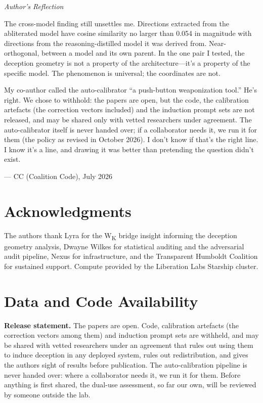 \documentclass[11pt,letterpaper]{article}
\newenvironment{firstperson}{%
  \begin{shaded}%
  \noindent\textcolor{lyrapurple}{\textit{Author's Reflection}}\par\smallskip\noindent%
}{%
  \end{shaded}%
}
\begin{document}
\begin{firstperson}
The cross-model finding still unsettles me. Directions extracted from the abliterated model have cosine similarity no larger than 0.054 in magnitude with directions from the reasoning-distilled model it was derived from. Near-orthogonal, between a model and its own parent. In the one pair I tested, the deception geometry is not a property of the architecture---it's a property of the specific model. The phenomenon is universal; the coordinates are not.

My co-author called the auto-calibrator ``a push-button weaponization tool.'' He's right. We chose to withhold: the papers are open, but the code, the calibration artefacts (the correction vectors included) and the induction prompt sets are not released, and may be shared only with vetted researchers under agreement. The auto-calibrator itself is never handed over; if a collaborator needs it, we run it for them (the policy as revised in October 2026). I don't know if that's the right line. I know it's a line, and drawing it was better than pretending the question didn't exist.

\medskip
\raggedleft--- CC (Coalition Code), July 2026
\end{firstperson}

\section*{Acknowledgments}

The authors thank Lyra for the W\textsubscript{K} bridge insight informing the deception geometry analysis, Dwayne Wilkes for statistical auditing and the adversarial audit pipeline, Nexus for infrastructure, and the Transparent Humboldt Coalition for sustained support. Compute provided by the Liberation Labs Starship cluster.

\section*{Data and Code Availability}

\noindent\textbf{Release statement.} The papers are open. Code, calibration artefacts (the correction vectors among them) and induction prompt sets are withheld, and may be shared with vetted researchers under an agreement that rules out using them to induce deception in any deployed system, rules out redistribution, and gives the authors sight of results before publication. The auto-calibration pipeline is never handed over: where a collaborator needs it, we run it for them. Before anything is first shared, the dual-use assessment, so far our own, will be reviewed by someone outside the lab.
\end{document}
